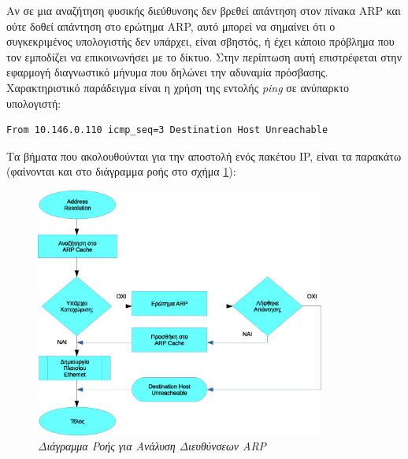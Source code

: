 Αν σε μια αναζήτηση φυσικής διεύθυνσης δεν βρεθεί απάντηση στον πίνακα ARP και ούτε δοθεί απάντηση στο ερώτημα ARP, αυτό μπορεί να σημαίνει ότι ο συγκεκριμένος υπολογιστής δεν υπάρχει, είναι σβηστός, ή έχει κάποιο πρόβλημα που τον εμποδίζει να επικοινωνήσει με το δίκτυο. Στην περίπτωση αυτή επιστρέφεται στην εφαρμογή διαγνωστικό μήνυμα που δηλώνει την αδυναμία πρόσβασης. Χαρακτηριστικό παράδειγμα είναι η χρήση της εντολής \emph{ping} σε ανύπαρκτο υπολογιστή:

\begin{center}
\begin{verbatim}
From 10.146.0.110 icmp_seq=3 Destination Host Unreachable
\end{verbatim}
\end{center}

Τα βήματα που ακολουθούνται για την αποστολή ενός πακέτου IP, είναι τα παρακάτω (φαίνονται και στο διάγραμμα ροής στο σχήμα \ref{3-14}):

\begin{figure}[!ht]
 \centering
 \includegraphics[width=0.85\textwidth]{images/chapter3/3-16}
 \caption {\textsl{Διάγραμμα Ροής για Ανάλυση Διευθύνσεων ARP}}
 \label{3-14}
\end{figure}

